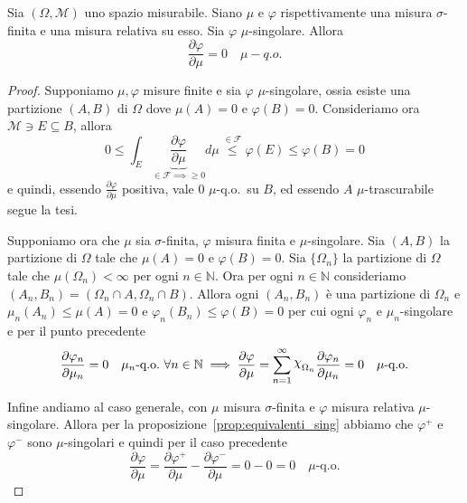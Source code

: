 \begin{theorem}
    Sia \({(\Omega, \mathcal{M})}\) uno spazio misurabile. Siano \(\mu\) e
    \(\varphi \) rispettivamente una misura \(\sigma\)-finita e una misura
    relativa su esso. Sia \(\varphi \) \(\mu\)-singolare. Allora
    \[
        \frac{\partial \varphi }{\partial \mu} = 0 \quad \mu-q.o.
    \]

\end{theorem}
\begin{proof}
    Supponiamo \(\mu, \varphi \) misure finite e sia \(\varphi \)
    \(\mu\)-singolare, ossia esiste una partizione \({(A, B)}\) di \(\Omega\)
    dove \(\mu{(A)} = 0\) e \(\varphi {(B)} = 0\). Consideriamo ora
    \(\mathcal{M} \ni E \subseteq B \), allora
    \[
        0 \le \int_E \underbrace{\frac{\partial \varphi }{\partial \mu}}_{\in
        \mathcal{F} \implies \ge 0}  d\mu \overset{\in \mathcal{F}}{\le }
        \varphi (E) \le \varphi {(B)} = 0
    \]
    e quindi, essendo \(\frac{\partial \varphi }{\partial \mu}\) positiva, vale
    \(0\) \(\mu\)-q.o.~su \(B\), ed essendo \(A\) \(\mu\)-trascurabile segue la
    tesi.

    Supponiamo ora che \(\mu\) sia \(\sigma\)-finita, \(\varphi \) misura finita
    e \(\mu\)-singolare. Sia \({(A, B)}\) la partizione di \(\Omega\) tale che
    \(\mu{(A)} = 0\) e \(\varphi {(B)} = 0\). Sia \(\{\Omega_n\}\) la partizione
    di \(\Omega\) tale che \(\mu{(\Omega_{n})}< \infty\) per ogni \(n \in
    \mathbb{N}\). Ora per ogni \(n \in \mathbb{N}\) consideriamo \({(A_{n},
    B_{n})} = {(\Omega_{n} \cap A, \Omega_{n} \cap B)}\). Allora ogni \({(A_{n},
B_{n})}\) è una partizione di \(\Omega_{n}\) e \(\mu_n{(A_{n})} \le \mu{(A)} =0\)
e \(\varphi_n {(B_{n})} \le \varphi {(B)} = 0\) per cui ogni \(\varphi _n\) e
\(\mu_{n}\)-singolare e per il punto precedente 
\[
    \frac{\partial \varphi_n }{\partial \mu_n} = 0 \quad \mu_n\text{-q.o.} \,\, \forall
    n \in \mathbb{N}\implies \frac{\partial \varphi }{\partial \mu} =
    \sum_{n=1}^{\infty} \rchi_{\Omega_n} \frac{\partial \varphi _n}{\partial
    \mu_{n}} = 0 \quad \mu\text{-q.o.}
\]
    
    Infine andiamo al caso generale, con \(\mu\) misura \(\sigma\)-finita e
    \(\varphi \) misura relativa \(\mu\)-singolare. Allora per la
    proposizione~\ref{prop:equivalenti_sing} abbiamo che \(\varphi^{+}\) e
    \(\varphi^{-}\) sono \(\mu\)-singolari e quindi per il caso precedente
    \[
        \frac{\partial \varphi }{\partial \mu} = \frac{\partial
        \varphi^{+}}{\partial \mu} - \frac{\partial \varphi^{-}}{\partial \mu} =
        0 - 0 = 0 \quad \mu\text{-q.o.}
    \]

\end{proof}

